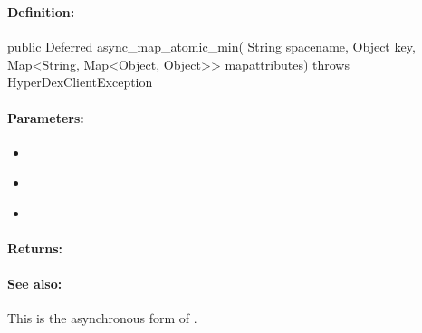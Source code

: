 \pagebreak
\subsubsection{}
\label{api:java:async_map_atomic_min}


\paragraph{Definition:}
\begin{javacode}
public Deferred async_map_atomic_min(
        String spacename,
        Object key,
        Map<String, Map<Object, Object>> mapattributes) throws HyperDexClientException
\end{javacode}

\paragraph{Parameters:}
\begin{itemize}[noitemsep]
\item {}\\

\item {}\\

\item {}\\

\end{itemize}

\paragraph{Returns:}


\paragraph{See also:}  This is the asynchronous form of .

\pagebreak
\subsubsection{}
\label{api:java:cond_map_atomic_min}


